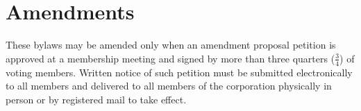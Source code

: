 \documentclass[10pt,letterpaper,titlepage]{article}
\begin{document}
\section{Amendments}
\label{amendments}
 
These bylaws may be amended only when an amendment proposal petition is
approved at a membership meeting and signed by more than three quarters
($\frac{3}{4}$) of voting members.
Written notice of such petition must be submitted electronically to all members
and delivered to all members of the corporation physically in person or by
registered mail to take effect.
\end{document}
